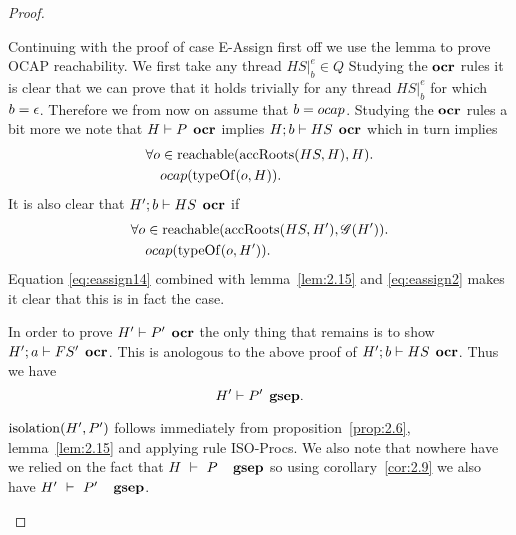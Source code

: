 \begin{proof}
\begin{description}
\begin{description}
\begin{description}
              Continuing with the proof of case {\sc E-Assign} first off we use
              the lemma to prove OCAP reachability.  We first take any thread
              $HS|_b^e \in Q$ Studying the $\mbox{\bf ocr}$ rules it is clear that we can
              prove that it holds trivially for any thread $HS|_b^e$ for which
              $b = \mbox{$\epsilon$}$.  Therefore we from now on assume that $b = \mbox{$ocap$}$.
              Studying the $\mbox{\bf ocr}$ rules a bit more we note that $H \vdash P
              \:\: \mbox{\bf ocr}$ implies $H;b \vdash HS \:\: \mbox{\bf ocr}$ which in turn
              implies
              \begin{equation}\label{eq:eassign14}
                \begin{aligned}
                  \forall o &\in \mbox{$\mathrm{reachable}$}(\mbox{$\mathrm{accRoots}$}(HS, H), H). \\
                            &\mbox{$ocap$}(\mbox{$\mathrm{typeOf}$}(o, H)).
                \end{aligned}
              \end{equation}
              It is also clear that $H';b \vdash HS \:\: \mbox{\bf ocr}$ if
              \begin{equation}
                \begin{aligned}
                  \forall o &\in \mbox{$\mathrm{reachable}$}(\mbox{$\mathrm{accRoots}$}(HS, H'), \mathscr{G}(H')). \\
                            &\mbox{$ocap$}(\mbox{$\mathrm{typeOf}$}(o, H')).
                \end{aligned}
              \end{equation}
              Equation \eqref{eq:eassign14} combined with lemma~\ref{lem:2.15} and
              \eqref{eq:eassign2} makes it clear that this is in fact the case.

              In order to prove $H' \vdash P' \:\: \mbox{\bf ocr}$ the only thing that
              remains is to show $H';a \vdash FS' \:\: \mbox{\bf ocr}$. This is anologous
              to the above proof of $H';b \vdash HS \:\: \mbox{\bf ocr}$. Thus we have
              \begin{equation*}
                H' \vdash P' \:\: \mbox{\bf gsep}.
              \end{equation*}

              $\mbox{$\mathrm{isolation}$}(H', P')$ follows immediately from
              proposition~\ref{prop:2.6}, lemma~\ref{lem:2.15} and applying rule
              {\sc ISO-Procs}. We also note that nowhere have we relied on the
              fact that $H~\vdash~P~\:\:~\mbox{\bf gsep}$ so using
              corollary~\ref{cor:2.9} we also have $H'~\vdash~P'~\:\:~\mbox{\bf gsep}$.


\end{description}
\end{description}
\end{description}
\end{proof}
